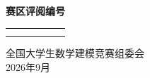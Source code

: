 \begin{center}
    {\LARGE \textbf{赛\hspace{1em}区\hspace{1em}评\hspace{1em}阅\hspace{1em}编\hspace{1em}号}}
\end{center}

\vspace{3cm}

\begin{center}
    \begin{tabular}{|c|c|c|c|c|c|}
    \hline
    & & & & & \\
    \hline
    & & & & & \\
    \hline
    & & & & & \\
    \hline
    \end{tabular}
\end{center}

\vspace{2cm}

\begin{flushright}
    全国大学生数学建模竞赛组委会\\
    2026年9月
\end{flushright}

